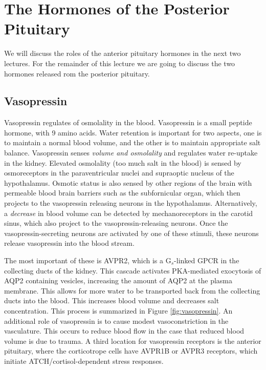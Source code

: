 \documentclass{tufte-handout}
\begin{document}
\section{The Hormones of the Posterior Pituitary}

We will discuss the roles of the anterior pituitary hormones in the next two lectures.  For the remainder of this lecture we are going to discuss the two hormones released rom the posterior pituitary.

\subsection{Vasopressin}

Vasopressin regulates of osmolality in the blood.  Vasopressin is a small peptide hormone, with 9 amino acids.  Water retention is important for two aspects, one is to maintain a normal blood volume, and the other is to maintain appropriate salt balance.  Vasopressin senses \emph{volume and osmolality} and regulates water re-uptake in the kidney.  Elevated osmolality (too much salt in the blood) is sensed by osmoreceptors in the  paraventricular nuclei  and supraoptic nucleus of the hypothalamus.  Osmotic status is also sensed by other regions of the brain with permeable blood brain barriers such as the subfornicular organ, which then projects to the vasopressin releasing neurons in the hypothalamus.  Alternatively, a \emph{decrease} in blood volume can be detected by mechanoreceptors in the carotid sinus, which also project to the vasopressin-releasing neurons.  Once the vasopressin-secreting neurons are activated by one of these stimuli, these neurons release vasopressin into the blood stream.

 The most important of these is AVPR2, which is a G$_s$-linked GPCR in the collecting ducts of the kidney.  This cascade activates PKA-mediated exocytosis of AQP2 containing vesicles, increasing the amount of AQP2 at the plasma membrane.  This allows for more water to be transported back from the collecting ducts into the blood.  This increases blood volume and decreases salt concentration.  This process is summarized in Figure \ref{fig:vasopressin}.  An additional role of vasopressin is to cause modest vasoconstriction in the vasculature.  This occurs to reduce blood flow in the case that reduced blood volume is due to trauma.  A third location for vasopressin receptors is the anterior pituitary, where the corticotrope cells have AVPR1B or AVPR3 receptors, which initiate  ATCH/cortisol-dependent stress responses.
\end{document}
